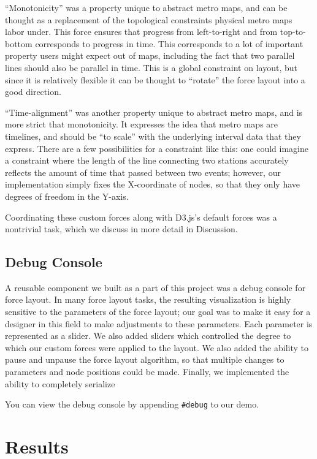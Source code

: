 \documentclass{chi2009}
\begin{document}
``Monotonicity'' was a property unique to abstract metro maps, and can
be thought as a replacement of the topological constraints physical
metro maps labor under.  This force ensures that progress from
left-to-right and from top-to-bottom corresponds to progress in time.
This corresponds to a lot of important property users might expect out
of maps, including the fact that two parallel lines should also be parallel
in time.  This is a global constraint on layout, but since it is relatively
flexible it can be thought to ``rotate'' the force layout into a good direction.

``Time-alignment'' was another property unique to abstract metro maps,
and is more strict that monotonicity.  It expresses the idea that metro maps
are timelines, and should be ``to scale'' with the underlying interval data
that they express.  There are a few possibilities for a constraint like this:
one could imagine a constraint where the length of the line connecting two
stations accurately reflects the amount of time that passed between two events;
however, our implementation simply fixes the X-coordinate of nodes, so that
they only have degrees of freedom in the Y-axis.

Coordinating these custom forces along with D3.js's default forces was a nontrivial
task, which we discuss in more detail in Discussion.

\subsection{Debug Console}

A reusable component we built as a part of this project was a debug
console for force layout.  In many force layout tasks, the resulting
visualization is highly sensitive to the parameters of the force layout;
our goal was to make it easy for a designer in this field to make
adjustments to these parameters.  Each parameter is represented as a
slider.  We also added sliders which controlled the degree to which our
custom forces were applied to the layout.  We also added the ability to
pause and unpause the force layout algorithm, so that multiple changes
to parameters and node positions could be made.  Finally, we implemented
the ability to completely serialize 

You can view the debug console by appending \verb|#debug| to our demo.

\section{Results}
\end{document}
